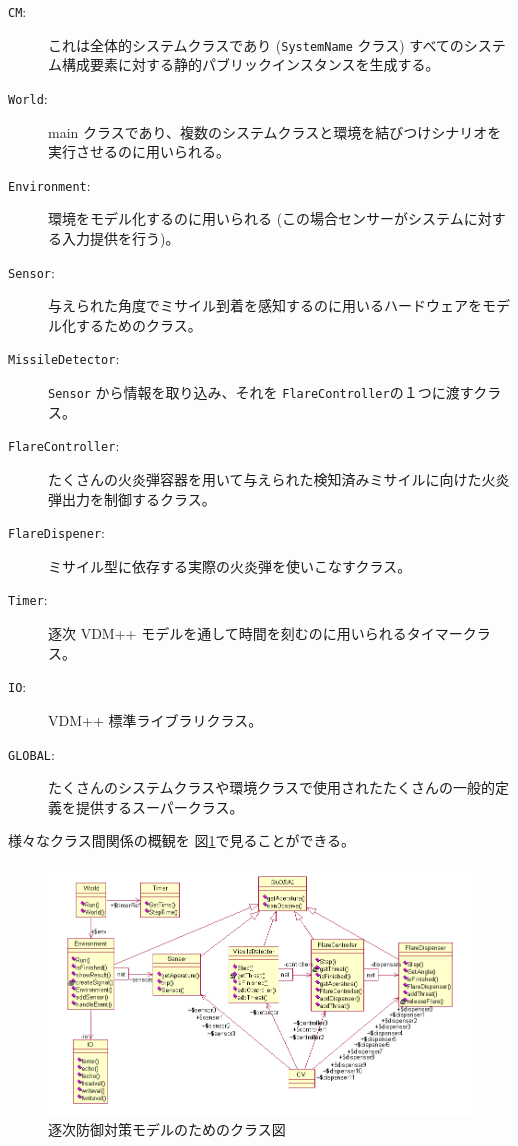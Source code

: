 \documentclass[\pformat,12pt]{jreport}
\begin{document}
\begin{description}
\item[\texttt{CM}:] これは全体的システムクラスであり (\texttt{SystemName} クラス) すべてのシステム構成要素に対する静的パブリックインスタンスを生成する。 
\item[\texttt{World}:]  main クラスであり、複数のシステムクラスと環境を結びつけシナリオを実行させるのに用いられる。
\item[\texttt{Environment}:] 環境をモデル化するのに用いられる (この場合センサーがシステムに対する入力提供を行う)。
\item[\texttt{Sensor}:] 与えられた角度でミサイル到着を感知するのに用いるハードウェアをモデル化するためのクラス。
\item[\texttt{MissileDetector}:]  \texttt{Sensor} から情報を取り込み、それを \texttt{FlareController}の１つに渡すクラス。
\item[\texttt{FlareController}:] たくさんの火炎弾容器を用いて与えられた検知済みミサイルに向けた火炎弾出力を制御するクラス。
\item[\texttt{FlareDispener}:] ミサイル型に依存する実際の火炎弾を使いこなすクラス。
\item[\texttt{Timer}:] 逐次 VDM++ モデルを通して時間を刻むのに用いられるタイマークラス。
\item[\texttt{IO}:]  VDM++ 標準ライブラリクラス。
\item[\texttt{GLOBAL}:] たくさんのシステムクラスや環境クラスで使用されたたくさんの一般的定義を提供するスーパークラス。
\end{description}

様々なクラス間関係の概観を 図\ref{fig:classdiagseq}で見ることができる。

\begin{figure}
\begin{center}
\includegraphics[width=\textwidth]{seqCMclassdiag}
\end{center}
\caption{逐次防御対策モデルのためのクラス図\label{fig:classdiagseq}}
\end{figure}
\end{document}

